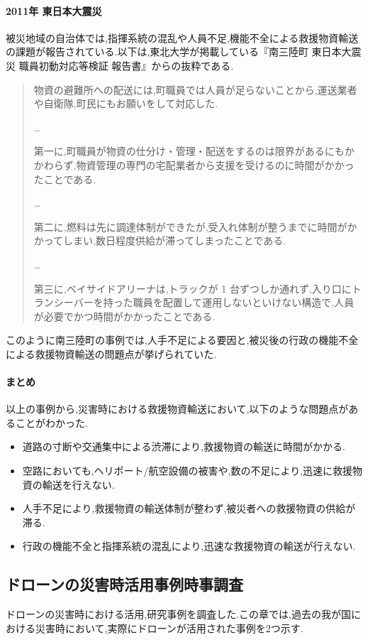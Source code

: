 \documentclass{article}[jsarticle]
\begin{document}
\paragraph{2011年 東日本大震災}
被災地域の自治体では,指揮系統の混乱や人員不足,機能不全による救援物資輸送の課題が報告されている.以下は,東北大学が掲載している『南三陸町 東日本大震災 職員初動対応等検証 報告書』からの抜粋である.
\begin{quote}
    物資の避難所への配送には,町職員では人員が足らないことから,運送業者や自衛隊,町民にもお願いをして対応した.\par 
    \ldots \par
    第一に,町職員が物資の仕分け・管理・配送をするのは限界があるにもかかわらず,物資管理の専門の宅配業者から支援を受けるのに時間がかかったことである.\par 
    \ldots \par
    第二に,燃料は先に調達体制ができたが,受入れ体制が整うまでに時間がかかってしまい,数日程度供給が滞ってしまったことである.\par
    \ldots \par
    第三に,ベイサイドアリーナは,トラックが 1 台ずつしか通れず,入り口にトランシーバーを持った職員を配置して運用しないといけない構造で,人員が必要でかつ時間がかかったことである.
\end{quote}
このように南三陸町の事例では,人手不足による要因と,被災後の行政の機能不全による救援物資輸送の問題点が挙げられていた.
\paragraph{まとめ}
以上の事例から,災害時における救援物資輸送において,以下のような問題点があることがわかった.
\begin{itemize}
    \item 道路の寸断や交通集中による渋滞により,救援物資の輸送に時間がかかる.
    \item 空路においても,ヘリポート/航空設備の被害や,数の不足により,迅速に救援物資の輸送を行えない.
    \item 人手不足により,救援物資の輸送体制が整わず,被災者への救援物資の供給が滞る.
    \item 行政の機能不全と指揮系統の混乱により,迅速な救援物資の輸送が行えない.
\end{itemize}

\subsection{ドローンの災害時活用事例時事調査}
ドローンの災害時における活用,研究事例を調査した.この章では,過去の我が国における災害時において,実際にドローンが活用された事例を2つ示す.
\end{document}
